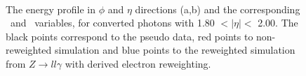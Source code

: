 \begin{figure}[htbp]
    \centering
	 \\
	\begin{tcolorbox}[colback=black!5!white,colframe=white!75!black]
    \caption{The energy profile in $\phi$ and $\eta$ directions (a,b) and the corresponding \Rphi \ and \Reta \ variables, for converted photons with 1.80 $ < |\eta| < $ 2.00. The black points correspond to the pseudo data, red points to non-reweighted simulation and blue points to the reweighted simulation from $Z\rightarrow ll\gamma$ with derived electron reweighting.}
    \label{Electron:4}
    \end{tcolorbox}
    
\end{figure}

